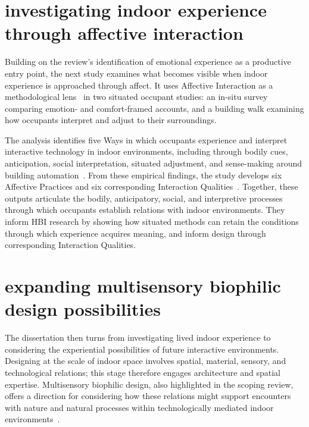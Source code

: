\section{investigating indoor experience through affective interaction}
Building on the review's identification of emotional experience as a productive entry point, the next study examines what becomes visible when indoor experience is approached through affect. It uses Affective Interaction as a methodological lens~\cite{lottridge2011affective, ahmadpour2025affective, rao2026emotion} in two situated occupant studies: an in-situ survey comparing emotion- and comfort-framed accounts, and a building walk examining how occupants interpret and adjust to their surroundings.

The analysis identifies five Ways in which occupants experience and
interpret interactive technology in indoor environments, including
through bodily cues, anticipation, social interpretation, situated
adjustment, and sense-making around building automation~\cite{rao2026emotion}. From these
empirical findings, the study develops six Affective Practices and six
corresponding Interaction Qualities~\cite{rao2026emotion}. Together, these outputs articulate the bodily, anticipatory, social, and interpretive processes through which occupants establish relations with indoor environments. They inform HBI research by showing how situated methods can retain the conditions through which experience acquires meaning, and inform design through corresponding Interaction Qualities.

\section{expanding multisensory biophilic design possibilities}
The dissertation then turns from investigating lived indoor experience to considering the experiential possibilities of future interactive environments. Designing at the scale of indoor space involves spatial, material, sensory, and technological relations; this stage therefore engages architecture and spatial expertise. Multisensory biophilic design, also highlighted in the scoping review\cite{rao2025smart}, offers a direction for considering how these relations might support encounters with nature and natural processes within technologically mediated indoor environments~\cite{rao2025lessons,rao2025designing}.

